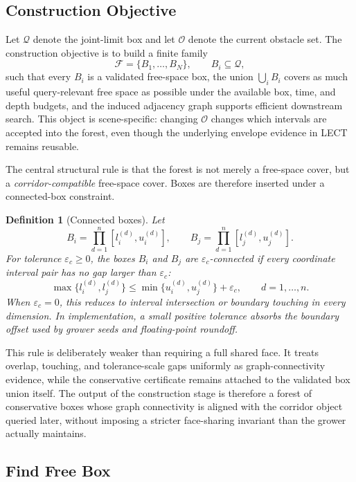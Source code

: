 \documentclass[journal]{IEEEtran}
\newtheorem{definition}{Definition}
\newcommand{\calO}{\ensuremath{\mathcal{O}}}
\newcommand{\Q}{\ensuremath{\mathcal{Q}}}
\begin{document}
\subsection{Construction Objective}\label{sec:forest_objective}

Let $\Q$ denote the joint-limit box and let $\calO$ denote the current obstacle
set. The construction objective is to build a finite family
\[
\mathcal{F} = \{B_1,\dots,B_N\}, \qquad B_i \subseteq \Q,
\]
such that every $B_i$ is a validated free-space box, the union
$\bigcup_i B_i$ covers as much useful query-relevant free space as possible
under the available box, time, and depth budgets, and the induced adjacency
graph supports efficient downstream search. This object is scene-specific:
changing $\calO$ changes which intervals are accepted into the forest, even
though the underlying envelope evidence in LECT remains reusable.

The central structural rule is that the forest is not merely a free-space cover,
but a \emph{corridor-compatible} free-space cover. Boxes are therefore inserted
under a connected-box constraint.

\begin{definition}[Connected boxes]\label{def:connected_boxes}
Let
\[
B_i = \prod_{d=1}^{n}[l_i^{(d)},u_i^{(d)}],
\qquad
B_j = \prod_{d=1}^{n}[l_j^{(d)},u_j^{(d)}].
\]
For tolerance $\varepsilon_c \ge 0$, the boxes $B_i$ and $B_j$ are
$\varepsilon_c$-connected if every coordinate interval pair has no gap larger
than $\varepsilon_c$:
\[
\max\{l_i^{(d)},l_j^{(d)}\}
\le
\min\{u_i^{(d)},u_j^{(d)}\}+\varepsilon_c,
\qquad d=1,\ldots,n.
\]
When $\varepsilon_c=0$, this reduces to interval intersection or boundary
touching in every dimension. In implementation, a small positive tolerance
absorbs the boundary offset used by grower seeds and floating-point roundoff.
\end{definition}

This rule is deliberately weaker than requiring a full shared face. It treats
overlap, touching, and tolerance-scale gaps uniformly as graph-connectivity
evidence, while the conservative certificate remains attached to the validated
box union itself. The output of the construction stage is therefore a forest of
conservative boxes whose graph connectivity is aligned with the corridor object
queried later, without imposing a stricter face-sharing invariant than the
grower actually maintains.

\subsection{Find Free Box}\label{sec:forest_ffb}
\end{document}
